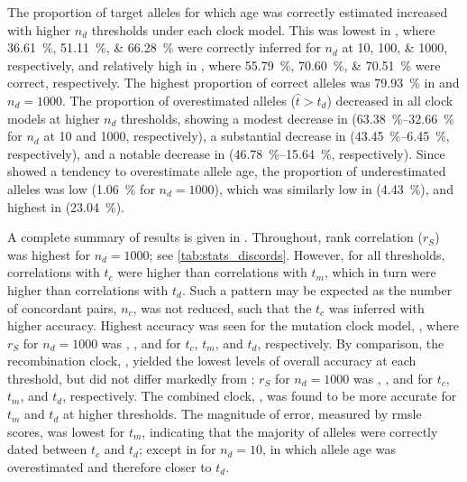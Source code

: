 The proportion of target alleles for which age was correctly estimated  increased with higher $n_d$ thresholds under each clock model.
This was lowest in \ClockM, where \SIlist{36.61;51.11;66.28}{\percent} were correctly inferred for $n_d$ at \numlist{10;100;1000}, respectively, and relatively high in \ClockR, where \SIlist{55.79;70.60;70.51}{\percent} were correct, respectively.
The highest proportion of correct alleles was \SI{79.93}{\percent} in \ClockC and ${n_d = \num{1000}}$.
The proportion of overestimated alleles (${\hat{t} > t_d}$) decreased in all clock models at higher $n_d$ thresholds, showing a modest decrease in \ClockM (\SIrange{63.38}{32.66}{\percent} for $n_d$ at \num{10} and \num{1000}, respectively), a substantial decrease in \ClockR (\SIrange{43.45}{6.45}{\percent}, respectively), and a notable decrease in \ClockC (\SIrange{46.78}{15.64}{\percent}, respectively).
Since \ClockM showed a tendency to overestimate allele age, the proportion of underestimated alleles was low (\SI{1.06}{\percent} for ${n_d = \num{1000}}$), which was similarly low in \ClockC (\SI{4.43}{\percent}), and highest in \ClockR (\SI{23.04}{\percent}).

%

%

A complete summary of results is given in .
Throughout, rank correlation ($r_S$) was highest for ${n_d = \num{1000}}$; see \cref{tab:stats_discords}.
However, for all thresholds, correlations with $t_c$ were higher than correlations with $t_m$, which in turn were higher than correlations with $t_d$.
Such a pattern may be expected as the number of concordant pairs, $n_c$, was not reduced, such that the $t_c$ was inferred with higher accuracy.
Highest accuracy was seen for the mutation clock model, \ClockM, where $r_S$ for ${n_d = \num{1000}}$ was , , and  for $t_c$, $t_m$, and $t_d$, respectively.
By comparison, the recombination clock, \ClockR, yielded the lowest levels of overall accuracy at each threshold, but did not differ markedly from \ClockM; \eg $r_S$ for ${n_d = \num{1000}}$ was , , and  for $t_c$, $t_m$, and $t_d$, respectively.
The combined clock, \ClockC, was found to be more accurate for $t_m$ and $t_d$ at higher thresholds.
The magnitude of error, measured by \gls{rmsle} scores, was lowest for $t_m$, indicating that the majority of alleles were correctly dated between $t_c$ and $t_d$; except in \ClockM for ${n_d = \num{10}}$, in which allele age was overestimated and therefore closer to $t_d$.

